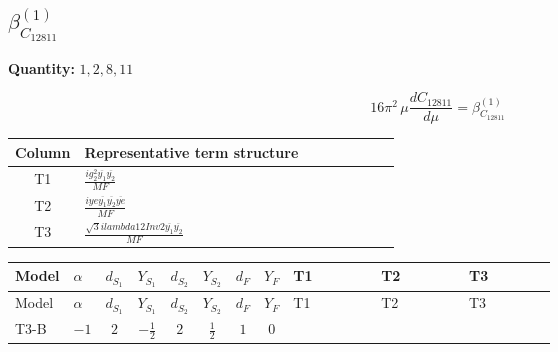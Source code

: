 \documentclass[8pt]{article}
\begin{document}
\begin{landscape}
\section*{$\beta_{C_{12811}}^{(1)}$}
\noindent\textbf{Quantity: }$\mathrm{1,2,8,11}$\par\smallskip
\[16\pi^2\,\mu\frac{d C_{12811}}{d\mu}=\beta_{C_{12811}}^{(1)}\]
\begin{center}
\begin{tabular}{@{}c >{\raggedright\arraybackslash}p{0.82\linewidth}@{}}
\toprule
Column & Representative term structure \\
\midrule
T1 & \(\displaystyle \frac{i g_{2}^{2} \overline{y_{1}} \overline{y_{2}}}{MF}\) \\
\midrule
T2 & \(\displaystyle \frac{i ye \overline{y_{1}} \overline{y_{2}} \overline{ye}}{MF}\) \\
\midrule
T3 & \(\displaystyle \frac{\sqrt{3} i lambda12Inv2 \overline{y_{1}} \overline{y_{2}}}{MF}\) \\
\midrule
\bottomrule
\end{tabular}
\end{center}
\smallskip
\tiny
\begin{longtable}{@{}llcccccc >{\raggedright\arraybackslash}p{0.21\linewidth} >{\raggedright\arraybackslash}p{0.21\linewidth} >{\raggedright\arraybackslash}p{0.21\linewidth}@{}}
\toprule
Model & $\alpha$ & $d_{S_1}$ & $Y_{S_1}$ & $d_{S_2}$ & $Y_{S_2}$ & $d_F$ & $Y_F$ & T1 & T2 & T3 \\
\midrule
\endfirsthead
\toprule
Model & $\alpha$ & $d_{S_1}$ & $Y_{S_1}$ & $d_{S_2}$ & $Y_{S_2}$ & $d_F$ & $Y_F$ & T1 & T2 & T3 \\
\midrule
\endhead
T3-B & $-1$ & $2$ & $-\frac{1}{2}$ & $2$ & $\frac{1}{2}$ & $1$ & $0$ & \scriptsize\adjustbox{max width=\linewidth}{$\begin{gathered} \frac{3 i g_{2}^{2} \overline{y_{1}} \overline{y_{2}}}{8 MF}\end{gathered}$} & \scriptsize\adjustbox{max width=\linewidth}{$\begin{gathered} - \frac{i ye \overline{y_{1}} \overline{y_{2}} \overline{ye}}{8 MF}\end{gathered}$} & \scriptsize\adjustbox{max width=\linewidth}{$\begin{gathered} \frac{\sqrt{3} i lambda12Inv2 \overline{y_{1}} \overline{y_{2}}}{6 MF}\end{gathered}$} \\
\midrule
\bottomrule
\end{longtable}
\clearpage

\end{landscape}
\end{document}
